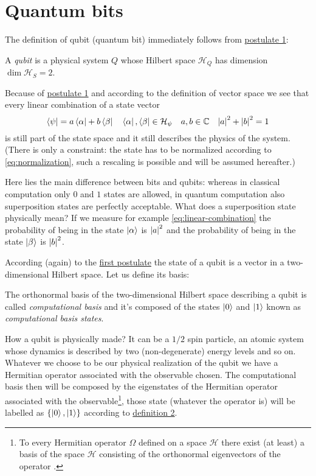 \section{Quantum bits}
The definition of qubit (quantum bit) immediately follows from \hyperref[postulate:1]{postulate 1}:
\begin{defn}
A \emph{qubit} is a physical system $Q$ whose Hilbert space $\mathcal{H}_Q$ has dimension $\dim\mathcal{H}_S = 2$.
\end{defn}
Because of \hyperref[postulate:1]{postulate 1} and according to the definition of vector space we see that every linear combination of a state vector
\begin{equation}\label{eq:linear-combination}
    \bra{\psi} = a \bra{\alpha} + b \bra{\beta} \quad \bra{\alpha},\bra{\beta} \in \mathcal{H}_\psi \quad a,b \in \mathbb{C} \quad \abs*{a}^2 + \abs*{b}^2 = 1
\end{equation}
is still part of the state space and it still describes the physics of the system. (There is only a constraint: the state has to be normalized according to \eqref{eq:normalization}, such a rescaling is possible and will be assumed hereafter.) 


Here lies the main difference between bits and qubits: whereas in classical computation only $0$ and $1$ states are allowed, in quantum computation also superposition states are perfectly acceptable.  What does a superposition state physically mean? If we measure for example \eqref{eq:linear-combination} the probability of being in the state $\ket{\alpha}$ is  $\abs*{a}^2$ and the probability of being in the state $\ket{\beta}$ is $\abs*{b}^2$.

According (again) to the \hyperref[postulate:1]{first postulate} the state of a qubit is a vector in a two-dimensional Hilbert space. Let us define its basis:
\begin{defn}\label{def:computational-basis}
The orthonormal basis of the two-dimensional Hilbert space describing a qubit is called \emph{computational basis} and it's composed of the states $\ket{0}$ and $\ket{1}$ known as \emph{computational basis states}.
\end{defn}
How a qubit is physically made?
It can be a $1/2$ spin particle, an atomic system whose dynamics is described by two (non-degenerate) energy levels and so on.
Whatever we choose to be our physical realization of the qubit we have a Hermitian operator associated with the observable chosen. The computational basis then will be composed by the eigenstates of the Hermitian operator associated with the observable\footnote{To every Hermitian operator $\Omega$ defined on a space $\mathcal{H}$ there exist (at least) a basis of the space $\mathcal{H}$ consisting of the orthonormal eigenvectors of the operator \cite[36]{Shankar}.}, those state (whatever the operator is) will be labelled as $\{\ket{0},\ket{1}\}$ according to \hyperref[def:computational-basis]{definition 2}.


